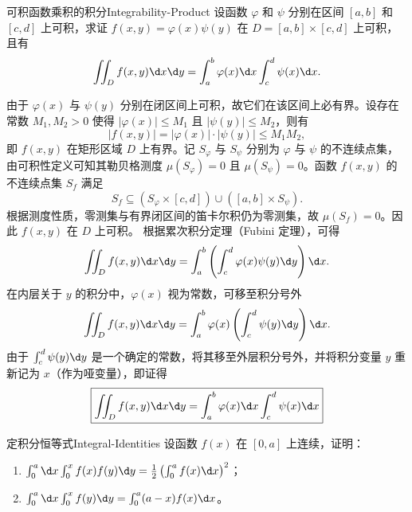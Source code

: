 \begin{problem}{可积函数乘积的积分}{Integrability-Product}
    设函数 $\varphi$ 和 $\psi$ 分别在区间 $[a, b]$ 和 $[c, d]$ 上可积，求证 $f(x, y) = \varphi(x) \psi(y)$ 在 $D = [a, b] \times [c, d]$ 上可积，且有
    \begin{equation}
        \iint_{D} f(x, y) \d x \d y = \int_{a}^{b} \varphi(x) \d x \int_{c}^{d} \psi(x) \d x.
    \end{equation}
\end{problem}

\begin{myproof}

    由于 $\varphi(x)$ 与 $\psi(y)$ 分别在闭区间上可积，故它们在该区间上必有界。设存在常数 $M_1, M_2 > 0$ 使得 $|\varphi(x)| \leqslant M_1$ 且 $|\psi(y)| \leqslant M_2$，则有
    \begin{equation}
        |f(x, y)| = |\varphi(x)| \cdot |\psi(y)| \leqslant M_1 M_2,
    \end{equation}
    即 $f(x, y)$ 在矩形区域 $D$ 上有界。记 $S_\varphi$ 与 $S_\psi$ 分别为 $\varphi$ 与 $\psi$ 的不连续点集，由可积性定义可知其勒贝格测度 $\mu(S_\varphi) = 0$ 且 $\mu(S_\psi) = 0$。函数 $f(x, y)$ 的不连续点集 $S_f$ 满足
    \begin{equation}
        S_f \subseteq (S_\varphi \times [c, d]) \cup ([a, b] \times S_\psi).
    \end{equation}
    根据测度性质，零测集与有界闭区间的笛卡尔积仍为零测集，故 $\mu(S_f) = 0$。因此 $f(x, y)$ 在 $D$ 上可积。
    根据累次积分定理（Fubini 定理），可得
    \begin{equation}\label{eq:fubini-calc}
        \iint_{D} f(x, y) \d x \d y = \int_{a}^{b} \left( \int_{c}^{d} \varphi(x) \psi(y) \d y \right) \d x.
    \end{equation}
    在内层关于 $y$ 的积分中，$\varphi(x)$ 视为常数，可移至积分号外
    \begin{equation}
        \iint_{D} f(x, y) \d x \d y = \int_{a}^{b} \varphi(x) \left( \int_{c}^{d} \psi(y) \d y \right) \d x.
    \end{equation}
    由于 $\int_{c}^{d} \psi(y) \d y$ 是一个确定的常数，将其移至外层积分号外，并将积分变量 $y$ 重新记为 $x$（作为哑变量），即证得
    \begin{equation}
        \boxed{\iint_{D} f(x, y) \d x \d y = \int_{a}^{b} \varphi(x) \d x \int_{c}^{d} \psi(x) \d x}
    \end{equation}
\end{myproof}


\begin{problem}{定积分恒等式}{Integral-Identities}
    设函数 $f(x)$ 在 $[0, a]$ 上连续，证明：
    \begin{enumerate}
        \item $\int_0^a \d x \int_0^x f(x)f(y) \d y = \frac{1}{2} \left( \int_0^a f(x) \d x \right)^2$；
        \item $\int_0^a \d x \int_0^x f(y) \d y = \int_0^a (a-x)f(x) \d x$。
    \end{enumerate}
\end{problem}

